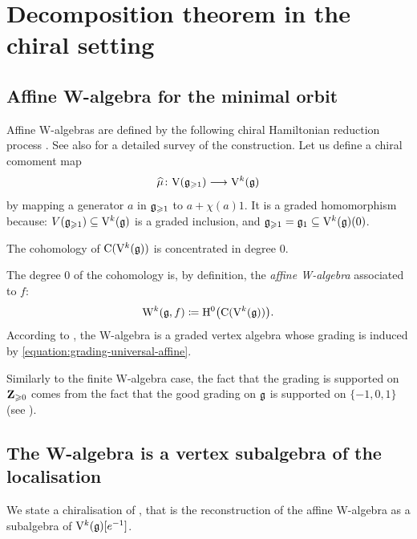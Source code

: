 
\section{Decomposition theorem in the chiral setting} \label{section:chiral-setting}

\subsection{Affine W-algebra for the minimal orbit}

Affine W-algebras are defined by the following chiral Hamiltonian reduction process \cite{feigin1990quantization,kac2003quantum,kac2004quantum}. See also \cite[Section 4]{genra2025reduction} for a detailed survey of the construction. Let us define a chiral comoment map
\[ \widehat\mu \colon \mathrm V(\mathfrak g_{\geqslant 1}) \longrightarrow \mathrm V^k(\mathfrak g) \]
by mapping a generator $a$ in $\mathfrak g_{\geqslant 1}$ to $a + \chi(a) 1$. It is a graded homomorphism because: $V(\mathfrak g_{\geqslant 1}) \subseteq \mathrm V^k(\mathfrak g)$ is a graded inclusion, and $\mathfrak g_{\geqslant 1} = \mathfrak g_1 \subseteq \mathrm V^k(\mathfrak g)(0)$.

\begin{theorem}
	The cohomology of $\mathrm{C}(\mathrm V^k(\mathfrak g))$ is concentrated in degree $0$.
\end{theorem}

The degree $0$ of the cohomology is, by definition, the \emph{affine W-algebra} associated to $f$:
\[ \mathrm W^k(\mathfrak g, f) \coloneqq \mathrm{H}^0\big(\mathrm{C}(\mathrm V^k(\mathfrak g))\big). \]
According to , the W-algebra is a graded vertex algebra whose grading is induced by \eqref{equation:grading-universal-affine}.

\begin{remark}
	Similarly to the finite W-algebra case, the fact that the grading is supported on $\mathbf{Z}_{\geqslant 0}$ comes from the fact that the good grading on $\mathfrak g$ is supported on $\{-1, 0, 1\}$ (see ).
\end{remark}

\subsection{The W-algebra is a vertex subalgebra of the localisation} \label{subsection:affine-w-algebra-coset}

We state a chiralisation of , that is the reconstruction of the affine W-algebra as a subalgebra of $\mathrm V^k(\mathfrak g)[e^{-1}]$. 

